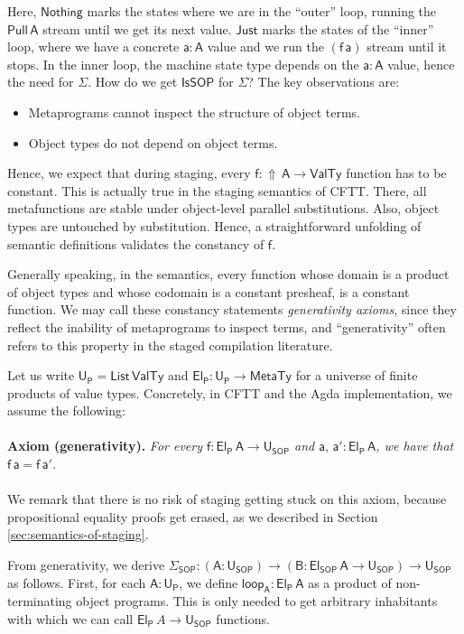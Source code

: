 \documentclass[acmsmall,screen,review,anonymous]{acmart}
\newcommand{\msf}[1]{{\mathsf{#1}}}
\newcommand{\vA}{\mathsf{A}}
\newcommand{\vB}{\mathsf{B}}
\newcommand{\va}{\mathsf{a}}
\newcommand{\vf}{\mathsf{f}}
\newcommand{\SOP}{\msf{SOP}}
\newcommand{\El}{\msf{El}}
\newcommand{\USOP}{\msf{U}_{\msf{SOP}}}
\newcommand{\Uprod}{\msf{U_P}}
\newcommand{\Elprod}{\msf{El_{P}}}
\newcommand{\IsSOP}{\msf{IsSOP}}
\newcommand{\List}{\msf{List}}
\newcommand{\Lift}{{\Uparrow}}
\newcommand{\MTy}{\msf{MetaTy}}
\newcommand{\VTy}{\msf{ValTy}}
\newcommand{\Nothing}{\msf{Nothing}}
\newcommand{\Just}{\msf{Just}}
\theoremstyle{remark}
\newcommand{\Pull}{\msf{Pull}}
\begin{document}
Here, $\Nothing$ marks the states where we are in the ``outer'' loop, running
the $\Pull\,\vA$ stream until we get its next value. $\Just$ marks the states of
the ``inner'' loop, where we have a concrete $\va : \vA$ value and we run the
$(\vf\,\va)$ stream until it stops. In the inner loop, the machine state type
depends on the $\va : \vA$ value, hence the need for $\Sigma$. How do we get
$\IsSOP$ for $\Sigma$? The key observations are:
\begin{itemize}
 \item Metaprograms cannot inspect the structure of object terms.
 \item Object types do not depend on object terms.
\end{itemize}
Hence, we expect that during staging, every $\vf : \Lift\,\vA \to \VTy$ function
has to be constant. This is actually true in the staging semantics of
CFTT. There, all metafunctions are stable under object-level parallel
substitutions. Also, object types are untouched by substitution. Hence, a
straightforward unfolding of semantic definitions validates the constancy of
$\vf$.

Generally speaking, in the semantics, every function whose domain is a product
of object types and whose codomain is a constant presheaf, is a constant
function. We may call these constancy statements \emph{generativity axioms},
since they reflect the inability of metaprograms to inspect terms, and
``generativity'' often refers to this property in the staged compilation
literature.

Let us write $\Uprod = \List\,\VTy$ and $\Elprod : \Uprod \to \MTy$ for a
universe of finite products of value types. Concretely, in CFTT and the Agda
implementation, we assume the following:
\\\\
\noindent \textbf{Axiom (generativity).}\textit{ For every $\vf : \Elprod\,\vA \to \USOP$ and $\va,\,\va' : \Elprod\,\vA$,
we have that $\vf\,\va = \vf\,\va'$.}
\\\\
We remark that there is no risk of staging getting stuck on this axiom, because
propositional equality proofs get erased, as we described in Section
\ref{sec:semantics-of-staging}.


From generativity, we derive $\Sigma_\SOP : (\vA : \USOP) \to (\vB : \El_\SOP\,\vA \to \USOP)
\to \USOP$ as follows. First, for each $\vA : \Uprod$, we define $\msf{loop_{\vA}} :
\Elprod\,\vA$ as a product of non-terminating object programs. This is only needed
to get arbitrary inhabitants with which we can call $\Elprod\,A \to \USOP$
functions.
\end{document}
